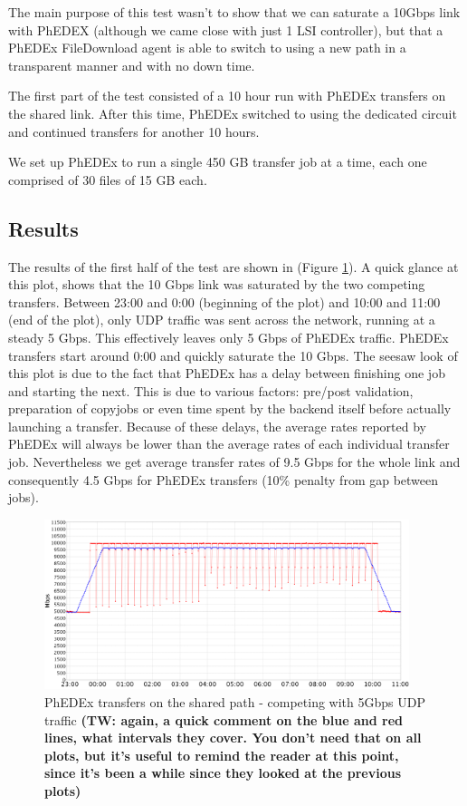 The main purpose of this test wasn't to show that we can saturate a 10Gbps link with
PhEDEX (although we came close with just 1 LSI controller), but that a PhEDEx FileDownload agent 
is able to switch to using a new path in a transparent manner and with no down time.

The first part of the test consisted of a 10 hour run with PhEDEx transfers on the 
shared link. After this time, PhEDEx switched to using the dedicated circuit and
continued transfers for another 10 hours.

We set up PhEDEx to run a single 450 GB transfer job at a time, each one 
comprised of 30 files of 15 GB each.

\subsection{Results}

The results of the first half of the test are shown in  (Figure \ref{fig:shared_transfers}).
A quick glance at this plot, shows that the 10 Gbps link was saturated by the two
competing transfers. Between 23:00 and 0:00 (beginning of the plot) and 
10:00 and 11:00 (end of the plot), only UDP traffic was sent across the network, 
running at a steady 5 Gbps. This effectively leaves only 5 Gbps of PhEDEx traffic.
PhEDEx transfers start around 0:00 and quickly saturate the 10 Gbps. 
The seesaw look of this plot is due to the fact that PhEDEx has a delay
between finishing one job and starting the next. This is due to various factors:
 pre/post validation, preparation of copyjobs or even time spent by the backend itself 
 before actually launching a transfer. Because of these delays, the average 
 rates reported by PhEDEx will always be lower than the average rates of each
 individual transfer job. Nevertheless we get average transfer rates of 9.5 Gbps for the
 whole link and consequently 4.5 Gbps for PhEDEx transfers (10\% penalty from
 gap between jobs).

\begin{figure}[h]
  \centering
  \includegraphics[width=0.95\textwidth]{Figures/FileDownload_Shared_path.png}
  \caption{PhEDEx transfers on the shared path - competing with 5Gbps UDP traffic
\textbf{(TW: again, a quick comment on the blue and red lines, what intervals they cover. You don't need that on all plots, but it's useful to remind the reader at this point, since it's been a while since they looked at the previous plots)}
  }
  \label{fig:shared_transfers}
\end{figure} 

